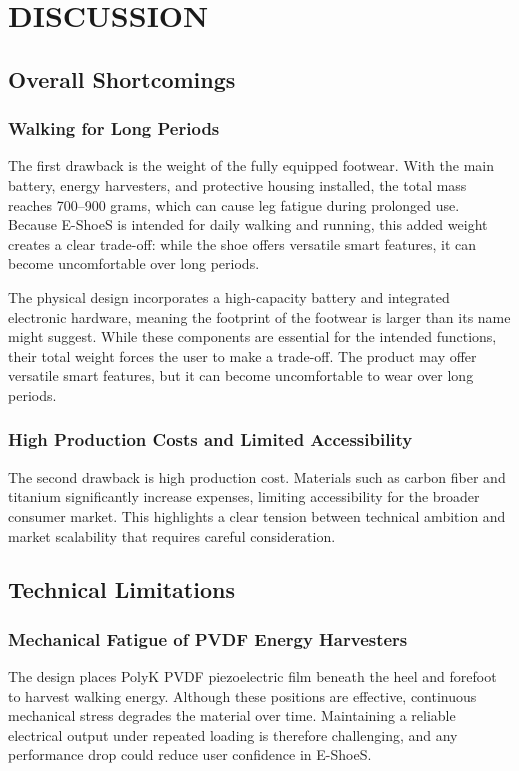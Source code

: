 \chapter{DISCUSSION}
\section{Overall Shortcomings} %
\subsection{Walking for Long Periods}\label{sec:WLP} %
The first drawback is the weight of the fully equipped footwear. With the main battery, energy harvesters, and protective housing installed, the total mass reaches 700--900 grams, which can cause leg fatigue during prolonged use. Because E-ShoeS is intended for daily walking and running, this added weight creates a clear trade-off: while the shoe offers versatile smart features, it can become uncomfortable over long periods.

The physical design incorporates a high-capacity battery and integrated electronic hardware, meaning the footprint of the footwear is larger than its name might suggest. While these components are essential for the intended functions, their total weight forces the user to make a trade-off. The product may offer versatile smart features, but it can become uncomfortable to wear over long periods.

\subsection{High Production Costs and Limited Accessibility}\label{sec:HPCLA} %
The second drawback is high production cost. Materials such as carbon fiber and titanium significantly increase expenses, limiting accessibility for the broader consumer market. This highlights a clear tension between technical ambition and market scalability that requires careful consideration.

\section{Technical Limitations} %
\subsection{Mechanical Fatigue of PVDF Energy Harvesters}\label{sec:MFPEH} %
The design places PolyK PVDF piezoelectric film beneath the heel and forefoot to harvest walking energy. Although these positions are effective, continuous mechanical stress degrades the material over time. Maintaining a reliable electrical output under repeated loading is therefore challenging, and any performance drop could reduce user confidence in E-ShoeS.

